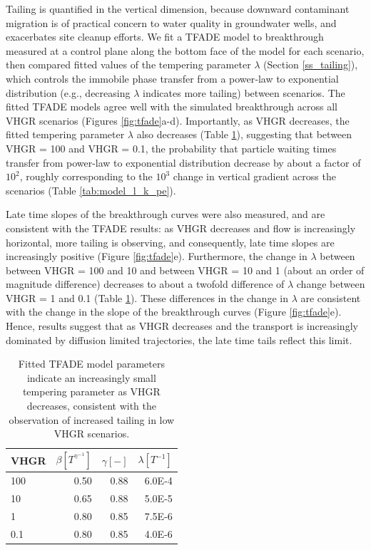 Tailing is quantified in the vertical dimension, because downward contaminant migration is of practical concern to water quality in groundwater wells, and exacerbates site cleanup efforts. We fit a TFADE model \citep{meerschaert2008tempered} to breakthrough measured at a control plane along the bottom face of the model for each scenario, then compared fitted values of the tempering parameter $\lambda$ (Section \ref{ss_tailing}), which controls the immobile phase transfer from a power‐law to exponential distribution (e.g., decreasing $\lambda$ indicates more tailing) between scenarios. 
The fitted TFADE models agree well with the simulated breakthrough across all VHGR scenarios (Figures \ref{fig:tfade}a-d). Importantly, as VHGR decreases, the fitted tempering parameter $\lambda$ also decreases (Table \ref{tab:tfade}), suggesting that between VHGR = 100 and VHGR = 0.1, the probability that particle waiting times transfer from power-law to exponential distribution decrease by about a factor of $10^2$, roughly corresponding to the $10^3$ change in vertical gradient across the scenarios (Table \ref{tab:model_l_k_pe}). 


Late time slopes of the breakthrough curves were also measured, and are consistent with the TFADE results: as VHGR decreases and flow is increasingly horizontal, more tailing is observing, and consequently, late time slopes are increasingly positive (Figure \ref{fig:tfade}e). Furthermore, the change in $\lambda$ between between VHGR = 100 and 10 and between VHGR = 10 and 1 (about an order of magnitude difference) decreases to about a twofold difference of $\lambda$ change between VHGR = 1 and 0.1 (Table \ref{tab:tfade}). These differences in the change in $\lambda$ are consistent with the change in the slope of the breakthrough curves (Figure \ref{fig:tfade}e). Hence, results suggest that as VHGR decreases and the transport is increasingly dominated by diffusion limited trajectories, the late time tails reflect this limit.



\bgroup
\begin{table}[ht]
\centering
\begin{tabular}{lrrr}
\hline
VHGR & $\beta [T^{\gamma}^{-1}]$ & $\gamma [-]$ & $\lambda [T^{-1}]$ \\

\hline
100 & 0.50 & 0.88 & 6.0E-4 \\
10  & 0.65 & 0.88 & 5.0E-5 \\
1   & 0.80 & 0.85 & 7.5E-6 \\
0.1 & 0.80 & 0.85 & 4.0E-6 \\

\hline
\end{tabular}
\caption{Fitted TFADE model parameters indicate an increasingly small tempering parameter as VHGR decreases, consistent with the observation of increased tailing in low VHGR scenarios.}
\label{tab:tfade}
\end{table}

